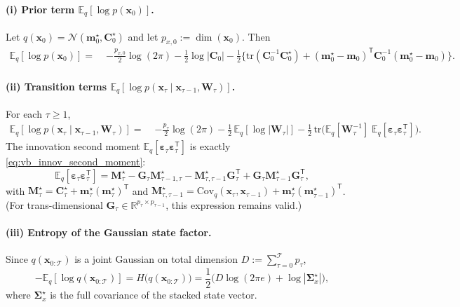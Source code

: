 \documentclass[11pt]{article}
\newcommand{\R}{\mathbb{R}}
\newcommand{\1}{\mathbb{I}}
\newcommand{\N}{\mathcal{N}}
\newcommand{\tr}{\mathrm{tr}}
\newcommand{\T}{\mathsf{T}}
\newcommand{\E}{\mathbb{E}}
\newcommand{\Cov}{\mathrm{Cov}}
\begin{document}
\paragraph{(i) Prior term $\E_q[\log p(\bm x_0)]$.}
Let $q(\bm x_0)=\N(\bm m_0^\star,\bm C_0^\star)$ and let $p_{x,0}:=\dim(\bm x_0)$. Then
\begin{align}
\E_q[\log p(\bm x_0)]
=\;& -\frac{p_{x,0}}{2}\log(2\pi) - \frac12\log|\bm C_0|
-\frac12\Big\{\tr(\bm C_0^{-1}\bm C_0^\star)
+(\bm m_0^\star-\bm m_0)^\T \bm C_0^{-1}(\bm m_0^\star-\bm m_0)\Big\}.
\label{eq:elbo_state_prior}
\end{align}


\paragraph{(ii) Transition terms $\E_q[\log p(\bm x_\tau\mid \bm x_{\tau-1},\bm W_\tau)]$.}
For each $\tau\ge 1$,
\begin{align}
\E_q[\log p(\bm x_\tau\mid \bm x_{\tau-1},\bm W_\tau)]
=\;&
-\frac{p_\tau}{2}\log(2\pi)
-\frac12\,\E_q[\log|\bm W_\tau|]
-\frac12\,\tr\!\Big(\E_q[\bm W_\tau^{-1}]\;\E_q[\bm\varepsilon_\tau\bm\varepsilon_\tau^\T]\Big).
\label{eq:elbo_state_trans_generic}
\end{align}
The innovation second moment $\E_q[\bm\varepsilon_\tau\bm\varepsilon_\tau^\T]$
is exactly \eqref{eq:vb_innov_second_moment}:
\[
\E_q[\bm\varepsilon_\tau\bm\varepsilon_\tau^\T]
=
\bm M_\tau^\star
-\bm G_\tau \bm M_{\tau-1,\tau}^\star
-\bm M_{\tau,\tau-1}^\star \bm G_\tau^\T
+\bm G_\tau \bm M_{\tau-1}^\star \bm G_\tau^\T,
\]
with $\bm M_\tau^\star=\bm C_\tau^\star+\bm m_\tau^\star(\bm m_\tau^\star)^\T$ and
$\bm M_{\tau,\tau-1}^\star=\Cov_q(\bm x_\tau,\bm x_{\tau-1})+\bm m_\tau^\star(\bm m_{\tau-1}^\star)^\T$.
(For trans-dimensional $\bm G_\tau\in\R^{p_\tau\times p_{\tau-1}}$, this expression remains valid.)

\paragraph{(iii) Entropy of the Gaussian state factor.}
Since $q(\bm x_{0:\mathcal{T}})$ is a joint Gaussian on total dimension
$D:=\sum_{\tau=0}^{\mathcal{T}} p_\tau$,
\begin{equation}
-\E_q[\log q(\bm x_{0:\mathcal{T}})]
=
H\big(q(\bm x_{0:\mathcal{T}})\big)
=
\frac12\Big(D\log(2\pi e) + \log|\bm\Sigma_x^\star|\Big),
\label{eq:elbo_state_entropy}
\end{equation}
where $\bm\Sigma_x^\star$ is the full covariance of the stacked state vector.
\end{document}
